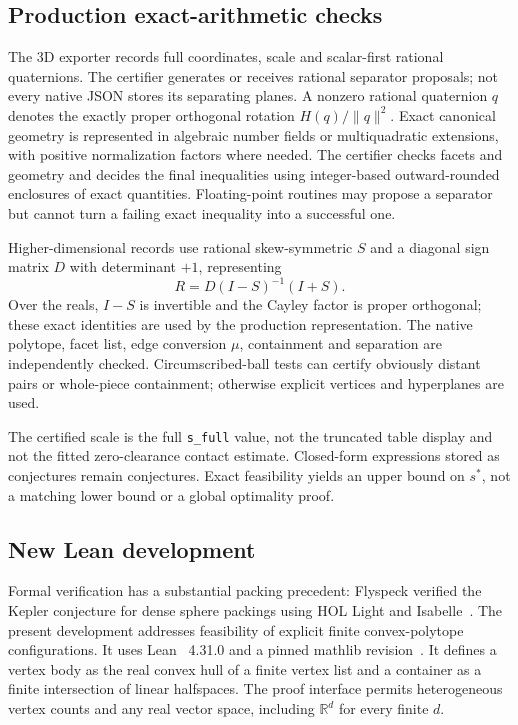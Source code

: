 \documentclass[11pt,a4paper]{article}
\newcommand{\R}{\mathbb R}
\newcommand{\code}[1]{\texttt{\nolinkurl{#1}}}
\begin{document}
\subsection{Production exact-arithmetic checks}
The 3D exporter records full coordinates, scale and scalar-first rational quaternions. The certifier generates or receives rational separator proposals; not every native JSON stores its separating planes. A nonzero rational quaternion $q$ denotes the exactly proper orthogonal rotation $H(q)/\|q\|^2$. Exact canonical geometry is represented in algebraic number fields or multiquadratic extensions, with positive normalization factors where needed. The certifier checks facets and geometry and decides the final inequalities using integer-based outward-rounded enclosures of exact quantities. Floating-point routines may propose a separator but cannot turn a failing exact inequality into a successful one.

Higher-dimensional records use rational skew-symmetric $S$ and a diagonal sign matrix $D$ with determinant $+1$, representing
\begin{equation}\label{eq:cayley}
R=D(I-S)^{-1}(I+S).
\end{equation}
Over the reals, $I-S$ is invertible and the Cayley factor is proper orthogonal; these exact identities are used by the production representation. The native polytope, facet list, edge conversion $\mu$, containment and separation are independently checked. Circumscribed-ball tests can certify obviously distant pairs or whole-piece containment; otherwise explicit vertices and hyperplanes are used.

The certified scale is the full \code{s_full} value, not the truncated table display and not the fitted zero-clearance contact estimate. Closed-form expressions stored as conjectures remain conjectures. Exact feasibility yields an upper bound on $s^*$, not a matching lower bound or a global optimality proof.

\subsection{New Lean development}
Formal verification has a substantial packing precedent: Flyspeck verified the Kepler conjecture for dense sphere packings using HOL Light and Isabelle~\cite{hales2017}. The present development addresses feasibility of explicit finite convex-polytope configurations. It uses Lean~\cite{lean4} 4.31.0 and a pinned mathlib revision~\cite{mathlib2020}. It defines a vertex body as the real convex hull of a finite vertex list and a container as a finite intersection of linear halfspaces. The proof interface permits heterogeneous vertex counts and any real vector space, including $\R^d$ for every finite $d$.
\end{document}
